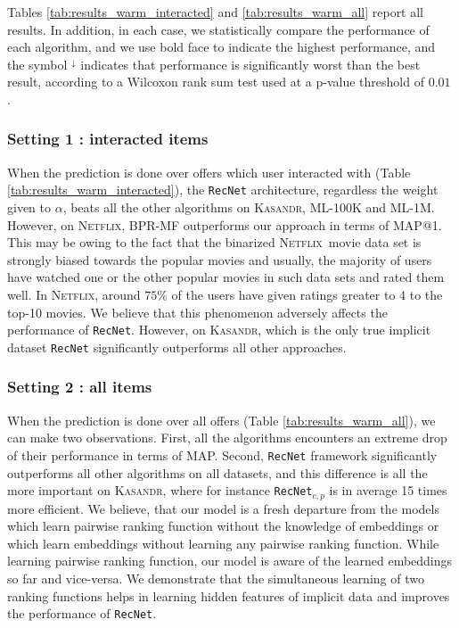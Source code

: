 \documentclass[10pt,journal,compsoc]{IEEEtran}
\newcommand{\NetF}{\textsc{Netflix}}
\newcommand{\ML}{\textsc{ML}}
\newcommand{\RecNet}{\texttt{RecNet}}
\newcommand{\Loss}{\mathcal{L}}
\newcommand{\DA}{^\downarrow}
\newcommand{\kasandr}{\textsc{Kasandr}}
\begin{document}
\begin{sloppypar}
Tables \ref{tab:results_warm_interacted} and \ref{tab:results_warm_all} report all results. In addition, in each case, we statistically compare the performance of each algorithm, and we use bold face to indicate the highest performance, and the symbol $\DA$ indicates that performance is significantly worst than the best result, according to a Wilcoxon rank sum test used at a p-value threshold of $0.01$ \cite{lehmann_06}.


\subsubsection*{Setting 1 : interacted items}
When the prediction is done over offers which user interacted with (Table \ref{tab:results_warm_interacted}), the {\RecNet} architecture, regardless the weight given to $\alpha$, beats all the other algorithms on {\kasandr}, {\ML}-100K and {\ML}-1M. However, on {\NetF}, BPR-MF outperforms our approach in terms of MAP@1. This may be owing to the fact that the binarized \NetF\ movie data set is strongly biased towards the popular movies and usually, the majority of users have watched one or the other popular movies in such data sets and rated them well. In {\NetF}, around $75\%$ of the users have given ratings greater to 4 to the top-10 movies. We believe that this phenomenon adversely affects the performance of {\RecNet}. However, on {\kasandr}, which is the only true implicit dataset {\RecNet} significantly outperforms all other approaches.

\subsubsection*{Setting 2 : all items}
When the prediction is done over all offers (Table \ref{tab:results_warm_all}), we can make two observations. First, all the algorithms encounters an extreme drop of their performance in terms of MAP. Second, {\RecNet} framework significantly outperforms all other algorithms on all datasets, and this difference is all the more important on {\kasandr}, where for instance {\RecNet$_{c,p}$} is in average 15 times more efficient. We believe, that our model is a fresh departure from the models which learn pairwise ranking function without the knowledge of embeddings or which learn embeddings without learning any pairwise ranking function. While learning pairwise ranking function, our model is aware of the learned embeddings so far and vice-versa. We demonstrate that the simultaneous learning of two ranking functions helps in learning hidden features of implicit data and improves the performance of {\RecNet}.


\end{sloppypar}
\end{document}
